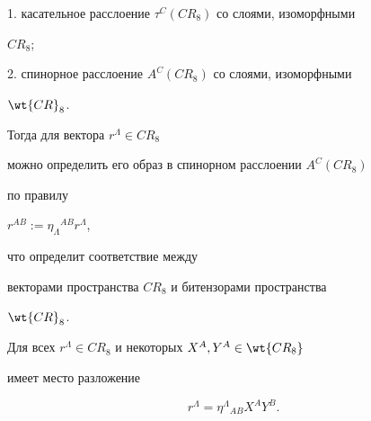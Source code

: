 1. касательное расслоение $\tau^C(CR_8)$ со слоями, изоморфными


$CR_8$;





2. спинорное расслоение $A^C(CR_8)$ со слоями, изоморфными


$\wt {CR}_8$.





Тогда для вектора $r^\Lambda\in CR_8$


можно определить его образ в спинорном расслоении $A^C(CR_8)$


по правилу




$r^{AB}:=\eta_\Lambda{}^{AB}r^\Lambda$,




что определит соответствие между


векторами пространства $CR_8$ и битензорами пространства


$\wt {CR}_8$.





\begin{thm}


\label{theorem1} 


Для всех $r^\Lambda \in CR_8$ и некоторых $X^A,Y^A \in \wt {CR_8}$


имеет место разложение


\begin{equation}


\label{e17}


r^\Lambda=\eta^\Lambda{}_{AB}X^AY^B.


\end{equation}


\end{thm}





